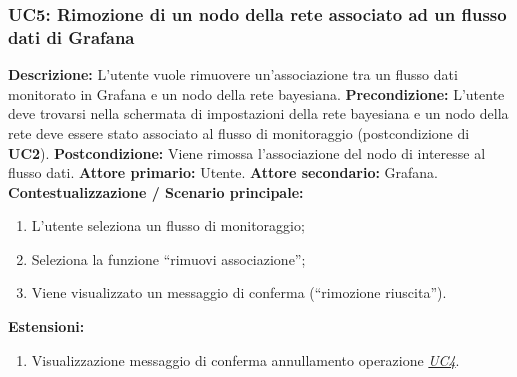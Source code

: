                 \subsubsection{UC5: Rimozione di un nodo della rete associato ad un flusso dati di Grafana}
                    \textbf{Descrizione:} L'utente vuole rimuovere un'associazione tra un flusso dati monitorato in Grafana e un nodo della rete bayesiana.
                    \newline
                    \textbf{Precondizione:} L’utente deve trovarsi nella schermata di impostazioni della rete bayesiana e un nodo della rete deve essere stato associato al flusso di monitoraggio (postcondizione di \textbf{UC2}).
                    \newline
                    \textbf{Postcondizione:} Viene rimossa l’associazione del nodo di interesse al flusso dati.
                    \newline
                    \textbf{Attore primario:} Utente.
                    \newline
                    \textbf{Attore secondario:} Grafana.
                    \newline
                    \textbf{Contestualizzazione / Scenario principale:} \begin{enumerate}
                            \item L’utente seleziona un flusso di monitoraggio;
                            \item Seleziona la funzione “rimuovi associazione”; 
                            \item Viene visualizzato un messaggio di conferma (“rimozione riuscita”).
                        \end{enumerate}
                    
                    \textbf{Estensioni:} 
                    \begin{enumerate}
                            \item Visualizzazione messaggio di conferma annullamento operazione \underline{\textit{UC4}}.
                        \end{enumerate}
                        
